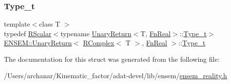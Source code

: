 \mbox{\label{structENSEM_1_1UnaryReturn_3_01RComplex_3_01T_01_4_00_01FnReal_01_4_a2495b3d7e3cfcf3f84d7bbf892bbfd3c}} 
\subsubsection{\texorpdfstring{Type\_t}{Type\_t}\hspace{0.1cm}{\footnotesize\ttfamily [3/3]}}
{\footnotesize\ttfamily template$<$class T $>$ \\
typedef \mbox{\hyperlink{classENSEM_1_1RScalar}{R\+Scalar}}$<$typename \mbox{\hyperlink{structENSEM_1_1UnaryReturn}{Unary\+Return}}$<$T, \mbox{\hyperlink{structENSEM_1_1FnReal}{Fn\+Real}}$>$\+::\mbox{\hyperlink{structENSEM_1_1UnaryReturn_3_01RComplex_3_01T_01_4_00_01FnReal_01_4_a2495b3d7e3cfcf3f84d7bbf892bbfd3c}{Type\+\_\+t}}$>$ \mbox{\hyperlink{structENSEM_1_1UnaryReturn}{E\+N\+S\+E\+M\+::\+Unary\+Return}}$<$ \mbox{\hyperlink{classENSEM_1_1RComplex}{R\+Complex}}$<$ T $>$, \mbox{\hyperlink{structENSEM_1_1FnReal}{Fn\+Real}} $>$\+::\mbox{\hyperlink{structENSEM_1_1UnaryReturn_3_01RComplex_3_01T_01_4_00_01FnReal_01_4_a2495b3d7e3cfcf3f84d7bbf892bbfd3c}{Type\+\_\+t}}}



The documentation for this struct was generated from the following file\+:\begin{DoxyCompactItemize}
\item 
/\+Users/archanar/\+Kinematic\+\_\+factor/adat-\/devel/lib/ensem/\mbox{\hyperlink{adat-devel_2lib_2ensem_2ensem__reality_8h}{ensem\+\_\+reality.\+h}}\end{DoxyCompactItemize}
